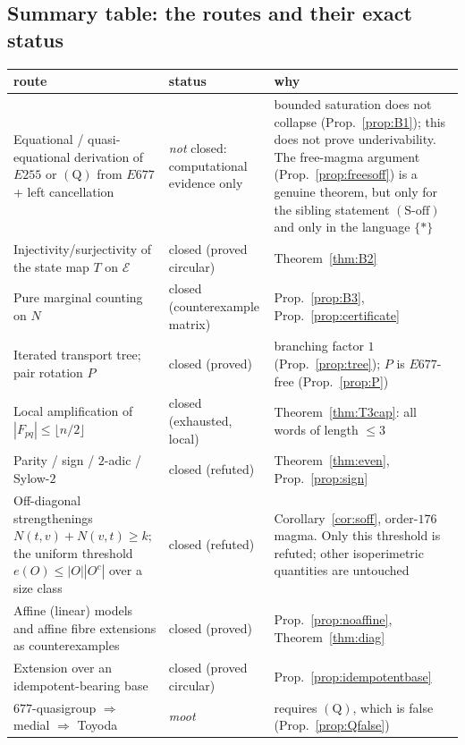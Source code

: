 \documentclass[11pt]{article}
\theoremstyle{plain}
\theoremstyle{definition}
\theoremstyle{remark}
\numberwithin{equation}{section}
\newcommand{\op}{\mathbin{*}}
\begin{document}
\subsection{Summary table: the routes and their exact status}\label{sec:blockedtable}

\begin{center}
\begin{tabular}{p{}p{}p{}}
\toprule
route & status & why\\
\midrule
Equational / quasi-equational derivation of $E255$ or $(\mathrm{Q})$ from $E677$ + left
cancellation & \emph{not} closed: computational evidence only & bounded saturation does not
collapse (Prop.~\ref{prop:B1}); this does not prove underivability. The free-magma argument
(Prop.~\ref{prop:freesoff}) is a genuine theorem, but only for the sibling statement
$(\mathrm{S\text{-}off})$ and only in the language $\{\op\}$\\
Injectivity/surjectivity of the state map $T$ on $\mathcal E$ & closed (proved circular) &
Theorem~\ref{thm:B2}\\
Pure marginal counting on $N$ & closed (counterexample matrix) & Prop.~\ref{prop:B3},
Prop.~\ref{prop:certificate}\\
Iterated transport tree; pair rotation $P$ & closed (proved) & branching factor $1$
(Prop.~\ref{prop:tree}); $P$ is $E677$-free (Prop.~\ref{prop:P})\\
Local amplification of $|F_{pq}|\le\lfloor n/2\rfloor$ & closed (exhausted, local) &
Theorem~\ref{thm:T3cap}: all words of length $\le3$\\
Parity / sign / $2$-adic / Sylow-$2$ & closed (refuted) & Theorem~\ref{thm:even},
Prop.~\ref{prop:sign}\\
Off-diagonal strengthenings $N(t,v)+N(v,t)\ge k$; the uniform threshold $e(O)\le|O||O^c|$
over a size class & closed (refuted) & Corollary~\ref{cor:soff}, order-$176$ magma. Only this
threshold is refuted; other isoperimetric quantities are untouched\\
Affine (linear) models and affine fibre extensions as counterexamples & closed (proved) &
Prop.~\ref{prop:noaffine}, Theorem~\ref{thm:diag}\\
Extension over an idempotent-bearing base & closed (proved circular) &
Prop.~\ref{prop:idempotentbase}\\
$677$-quasigroup $\Rightarrow$ medial $\Rightarrow$ Toyoda & \emph{moot} & requires
$(\mathrm{Q})$, which is false (Prop.~\ref{prop:Qfalse})\\

\end{tabular}
\end{center}
\end{document}
